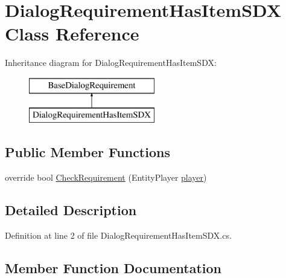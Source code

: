 \hypertarget{class_dialog_requirement_has_item_s_d_x}{}\section{Dialog\+Requirement\+Has\+Item\+S\+DX Class Reference}
\label{class_dialog_requirement_has_item_s_d_x}
Inheritance diagram for Dialog\+Requirement\+Has\+Item\+S\+DX\+:\begin{figure}[H]
\begin{center}
\leavevmode
\includegraphics[height=2.000000cm]{class_dialog_requirement_has_item_s_d_x}
\end{center}
\end{figure}
\subsection*{Public Member Functions}
\begin{DoxyCompactItemize}
\item 
override bool \mbox{\hyperlink{class_dialog_requirement_has_item_s_d_x_aed26e0d37e888fa22817ac23686f9c3e}{Check\+Requirement}} (Entity\+Player \mbox{\hyperlink{_sphere_i_i_01_music_01_boxes_2_config_2_localization_8txt_a4e2cb8aeff651600ea1cc57fe5a929a4}{player}})
\end{DoxyCompactItemize}


\subsection{Detailed Description}


Definition at line 2 of file Dialog\+Requirement\+Has\+Item\+S\+D\+X.\+cs.



\subsection{Member Function Documentation}
\mbox{\label{class_dialog_requirement_has_item_s_d_x_aed26e0d37e888fa22817ac23686f9c3e}} 
